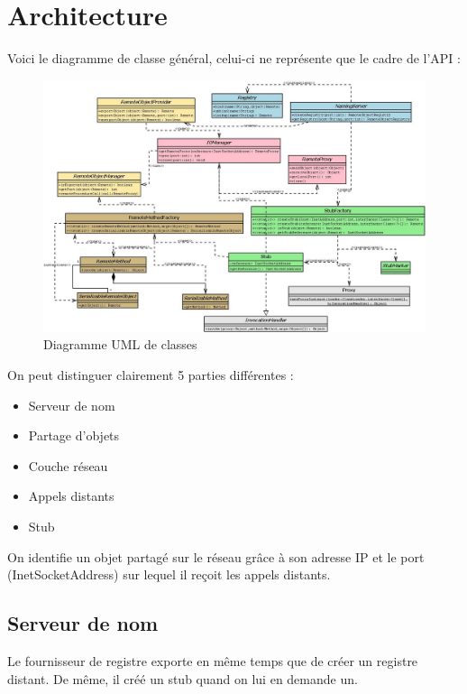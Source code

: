 \chapter{Architecture}

\hspace{-.6cm}Voici le diagramme de classe général, celui-ci ne représente que le cadre de l'API :
\begin{figure}[H]
\begin{center}
\includegraphics[scale=0.4,angle=90]{img/diag_classes.jpeg}
\caption{Diagramme UML de classes}
\end{center}
\end{figure}
\medskip
\hspace{-.6cm}On peut distinguer clairement 5 parties différentes :
\begin{itemize}
\item Serveur de nom
\item Partage d'objets
\item Couche réseau
\item Appels distants
\item Stub
\end{itemize}
\medskip

On identifie un objet partagé sur le réseau grâce à son adresse IP et le port (InetSocketAddress) sur lequel il reçoit les appels distants.

\section{Serveur de nom}
\hspace{-.6cm}Le fournisseur de registre exporte en même temps que de créer un registre distant. De même, il créé un stub quand on lui en demande un.


